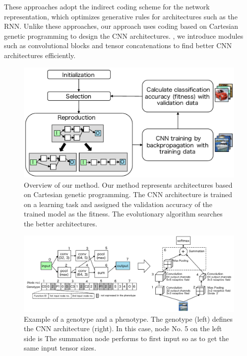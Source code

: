 These approaches adopt the indirect coding scheme for the network representation, which optimizes generative rules for  architectures such as the RNN.
Unlike these approaches, our approach uses  coding based on Cartesian genetic programming to design the CNN architectures.
, we introduce   modules\new{,} such as convolutional blocks and tensor concatenations\new{,} to find better CNN architectures efficiently.

\begin{figure}[t]
\includegraphics[width=0.99\linewidth, bb=0 0 526 276]{images/overview.pdf}
\caption{Overview of our method. Our method represents  architectures based on Cartesian genetic programming. The CNN architecture is trained on a learning task and assigned the validation accuracy of the trained model as the fitness. The evolutionary algorithm searches the better architectures.}
\label{overview}
\end{figure}

\begin{figure}[t]
\includegraphics[width=0.99\linewidth, bb=0 0 781 283]{images/genotype.pdf}
\caption{Example of a genotype and a phenotype. The genotype (left) defines the CNN architecture (right). In this case, node No. 5 on the left side is  The summation node performs  to  first input so as to get the same input tensor sizes.}
\label{genotype}
\end{figure}


